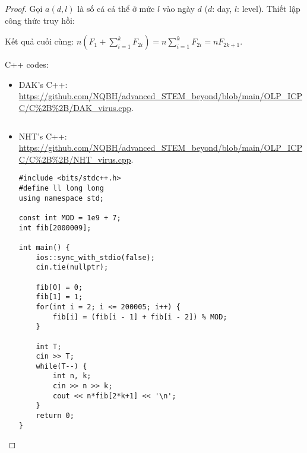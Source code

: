 \documentclass{article}
\begin{document}
\begin{proof}
	Gọi $a(d,l)$ là số cá cá thể ở mức $l$ vào ngày $d$ ($d$: day, $l$: level). Thiết lập công thức truy hồi:
	
	Kết quả cuối cùng: $n(F_1 + \sum_{i=1}^k F_{2i}) = n\sum_{i=1}^k F_{2i} = nF_{2k+1}$.
	
	C++ codes:
	\begin{itemize}
		\item DAK's C++: \url{https://github.com/NQBH/advanced_STEM_beyond/blob/main/OLP_ICPC/C%2B%2B/DAK_virus.cpp}.
\begin{verbatim}

\end{verbatim}
		\item NHT's C++: \url{https://github.com/NQBH/advanced_STEM_beyond/blob/main/OLP_ICPC/C%2B%2B/NHT_virus.cpp}.
\begin{verbatim}
#include <bits/stdc++.h>
#define ll long long
using namespace std;

const int MOD = 1e9 + 7;
int fib[2000009];   

int main() {
    ios::sync_with_stdio(false);
    cin.tie(nullptr);
	
    fib[0] = 0;
    fib[1] = 1; 
    for(int i = 2; i <= 200005; i++) {
        fib[i] = (fib[i - 1] + fib[i - 2]) % MOD;
    }
	
    int T;
    cin >> T;
    while(T--) {
        int n, k;
        cin >> n >> k;
        cout << n*fib[2*k+1] << '\n';
    }
    return 0;
}
\end{verbatim}
	\end{itemize}
\end{proof}
\end{document}
